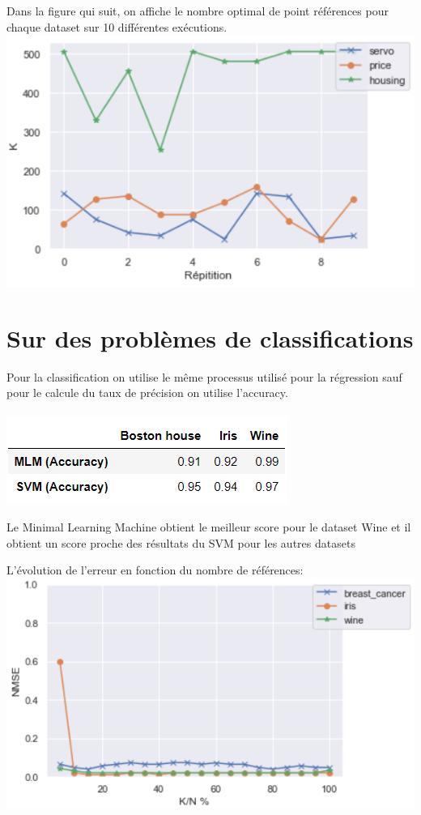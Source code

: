 \documentclass[12pt,a4paper]{report}
\begin{document}
Dans la figure qui suit, on affiche le nombre optimal de point références pour chaque dataset sur 10 différentes exécutions. \\
\includegraphics[scale=0.99]{regr3.png}\\
{\color{MidnightBlue}\section{Sur des problèmes de classifications}}
\par Pour la classification on utilise le même processus utilisé pour la régression sauf pour le calcule du taux de précision on utilise l'accuracy.\\\\\includegraphics[scale=0.99]{classif.png}\\
\par Le Minimal Learning Machine obtient le meilleur score pour le dataset Wine  et il obtient un score proche des résultats du SVM pour les autres datasets\\
\par L'évolution de l'erreur en fonction du nombre de références:\\\includegraphics[scale=0.99]{classif2.png}
\end{document}
